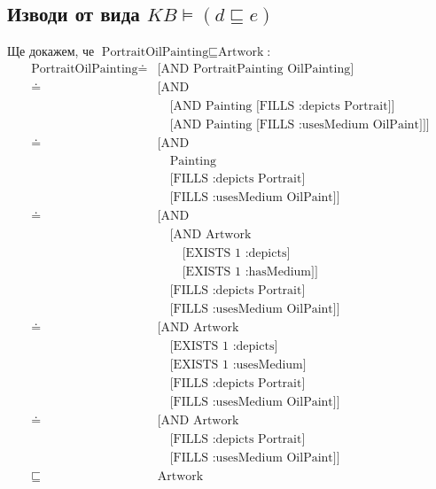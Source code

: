 \documentclass[a4paper, 11pt]{article}
\begin{document}
\subsection{Изводи от вида $KB \vDash (d \sqsubseteq e)$}
Ще докажем, че $\text{PortraitOilPainting} \sqsubseteq \text{Artwork}$:
\begin{align*}
  \text{PortraitOilPainting} 
  \doteq & \text{[AND PortraitPainting OilPainting]} \\
  \doteq & \text{[AND} \\
          & \quad \text{[AND Painting [FILLS :depicts Portrait]]} \\
          & \quad \text{[AND Painting [FILLS :usesMedium OilPaint]]]} \\
  \doteq & \text{[AND} \\
          & \quad \text{Painting} \\
          & \quad \text{[FILLS :depicts Portrait]} \\
          & \quad \text{[FILLS :usesMedium OilPaint]]} \\
  \doteq & \text{[AND} \\
          & \quad \text{[AND Artwork} \\
          & \qquad \text{[EXISTS 1 :depicts]} \\
          & \qquad \text{[EXISTS 1 :hasMedium]]} \\
          & \quad \text{[FILLS :depicts Portrait]} \\
          & \quad \text{[FILLS :usesMedium OilPaint]]} \\
  \doteq & \text{[AND Artwork} \\
          & \quad \text{[EXISTS 1 :depicts]} \\
          & \quad \text{[EXISTS 1 :usesMedium]} \\
          & \quad \text{[FILLS :depicts Portrait]} \\
          & \quad \text{[FILLS :usesMedium OilPaint]]} \\
  \doteq & \text{[AND Artwork} \\
          & \quad \text{[FILLS :depicts Portrait]} \\
          & \quad \text{[FILLS :usesMedium OilPaint]]} \\
  \sqsubseteq & \text{Artwork}
\end{align*}
\end{document}

